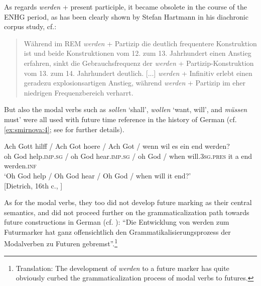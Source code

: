 \documentclass[output=paper,colorlinks,citecolor=brown]{langscibook}
\begin{document}
As regards \emph{werden} + present participle, it became obsolete in the course of the ENHG period, as has been clearly shown by Stefan Hartmann in his diachronic corpus study, cf.: 
\begin{quote}
    Während im REM \emph{werden} + Partizip die deutlich frequentere Konstruktion ist und beide Konstruktionen vom 12. zum 13. Jahrhundert einen Anstieg erfahren, sinkt die Gebrauchsfrequenz der \emph{werden} + Partizip-Konstruktion vom 13. zum 14. Jahrhundert deutlich. [...] \emph{werden} + Infinitiv erlebt einen geradezu explosionsartigen Anstieg, während \emph{werden} + Partizip im eher niedrigen Frequenzbereich verharrt. \citep[377]{Hartmann2021}\footnotemark
\end{quote}

But also the modal verbs such as \emph{sollen} `shall', \emph{wollen} `want, will', and \emph{müssen} must' were all used with future time reference in the history of German (cf. \ref{ex:smirnova:4}; see \cite{DiewaldHabermann2005} for further details). 

\ea \label{ex:smirnova:4}
\gll Ach Gott hilff / Ach Got hoere / Ach Got / wenn wil es ein end werden? \\
     oh God help.\textsc{imp.sg} / oh God hear.\textsc{imp.sg} / oh God / when will.\textsc{3sg.pres} it a end werden.\textsc{inf}\\
\glt `Oh God help / Oh God hear / Oh God / when will it end?'\\
     \hfill [Dietrich, 16th c., \citet[232]{DiewaldHabermann2005}]
\z

As for the modal verbs, they too did not develop future marking as their central semantics, and did not proceed further on the grammaticalization path towards future constructions in German (cf. \cite[232]{DiewaldHabermann2005}): ``Die Entwicklung von werden zum Futurmarker hat ganz offensichtlich den Grammatikalisierungsprozess der Modalverben zu Futuren gebremst''.\footnote{Translation: The development of \textit{werden} to a future marker has quite obviously curbed the grammaticalization process of modal verbs to futures.}
\end{document}
